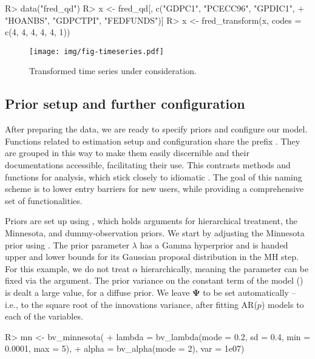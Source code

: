 \documentclass[article,nojss]{jss} %
\begin{document}
\begin{Schunk}
\begin{Sinput}
R> data("fred_qd")
R> x <- fred_qd[, c("GDPC1", "PCECC96", "GPDIC1",
+    "HOANBS", "GDPCTPI", "FEDFUNDS")]
R> x <- fred_transform(x, codes = c(4, 4, 4, 4, 4, 1))
\end{Sinput}
\end{Schunk}


\begin{figure}[ht]
	\centering
  \texttt{[image: img/fig-timeseries.pdf]}
	\caption{Transformed time series under consideration.}
	\label{fig:timeseries}
\end{figure}

\subsection{Prior setup and further configuration} \label{subsec:setup}

After preparing the data, we are ready to specify priors and configure our model.
Functions related to estimation setup and configuration share the prefix . They are grouped in this way to make them easily discernible and their documentations accessible, facilitating their use.
This contrasts methods and functions for analysis, which stick closely to idiomatic .
The goal of this naming scheme is to lower entry barriers for new users, while providing a comprehensive set of functionalities.

Priors are set up using , which holds arguments for hierarchical treatment, the Minnesota, and dummy-observation priors.
We start by adjusting the Minnesota prior using . The prior parameter $\lambda$ has a Gamma hyperprior and is handed upper and lower bounds for its Gaussian proposal distribution in the MH step. For this example, we do not treat $\alpha$ hierarchically, meaning the parameter can be fixed via the  argument. The prior variance on the constant term of the model () is dealt a large value, for a diffuse prior. We leave $\boldsymbol{\Psi}$ to be set automatically -- i.e., to the square root of the innovations variance, after fitting AR($p$) models to each of the variables.

\begin{Schunk}
\begin{Sinput}
R> mn <- bv_minnesota(
+    lambda = bv_lambda(mode = 0.2, sd = 0.4, min = 0.0001, max = 5),
+    alpha = bv_alpha(mode = 2), var = 1e07)
\end{Sinput}
\end{Schunk}
\end{document}
